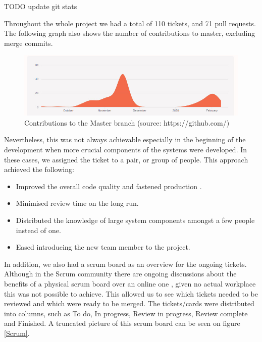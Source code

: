\documentclass[main.tex]{subfiles}
\begin{document}
TODO update git stats

Throughout the whole project we had a total of 110 tickets, and 71 pull requests. The following graph also shows the number of contributions to master, excluding merge commits.

\begin{figure}[H]
   \centering
   \includegraphics[width=\textwidth]{05Coding/05Pictures/contributions.jpg}
   \caption{Contributions to the Master branch (source: https://github.com/)}
\end{figure}

Nevertheless, this was not always achievable especially in the beginning of the development when more crucial components of the systems were developed. In these cases, we assigned the ticket to a pair, or group of people. This approach achieved the following:

\begin{itemize}
    \item Improved the overall code quality and fastened production \cite{pairprogramming}.
    \item Minimised review time on the long run.
    \item Distributed the knowledge of large system components amongst a few people instead of one.
    \item Eased introducing the new team member to the project.
\end{itemize}


In addition, we also had a scrum board as an overview for the ongoing tickets. Although in the Scrum community there are ongoing discussions about the benefits of a physical scrum board over an online one \cite{physicalscrum}, given no actual workplace this was not possible to achieve. This allowed us to see which tickets needed to be reviewed and which were ready to be merged. The tickets/cards were distributed into columns, such as To do, In progress, Review in progress, Review complete and Finished. A truncated picture of this scrum board can be seen on figure \figurename{\ref{Scrum}}.
\end{document}
